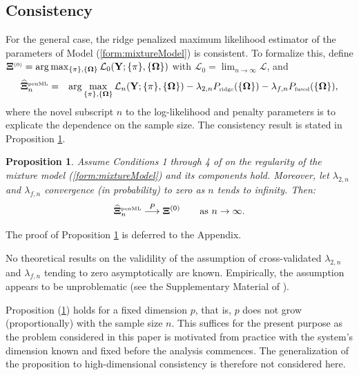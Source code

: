 \documentclass[10pt]{article}
\newtheorem{proposition}{Proposition}
\newcounter{proof}\newcounter{currproofctr}\newcounter{endproofctr}%
\begin{document}
\subsection{Consistency} 
For the general case, the ridge penalized maximum likelihood estimator of the parameters of Model (\ref{form:mixtureModel}) is consistent. To formalize this, define
$\mathbf{\Xi}^{\mbox{{\tiny (0)}}}  = \arg \max_{\{\pi \}, \{\mathbf{\Omega} \}} \mathcal{L}_0(\mathbf{Y}; \{\pi \}, \{\mathbf{\Omega} \} )$ with $\mathcal{L}_0 = \lim_{n\rightarrow \infty} \mathcal{L}$, and
\begin{eqnarray*}
\widehat{\mathbf{\Xi}}_n^{\mbox{{\tiny penML}}} & = & \arg \max_{\{\pi \}, \{\mathbf{\Omega} \}} \mathcal{L}_n(\mathbf{Y}; \{\pi \}, \{\mathbf{\Omega} \} ) - \lambda_{2,n} P_{\mbox{{\tiny ridge}}}( \{\mathbf{\Omega} \}) - \lambda_{f,n} P_{\mbox{{\tiny fused}}}( \{\mathbf{\Omega} \}),
\end{eqnarray*}
where the novel subscript $n$ to the log-likelihood and penalty parameters is to explicate the dependence on the sample size. %
The consistency result is stated in Proposition \ref{prop.consistency}.
\begin{proposition} \label{prop.consistency}
Assume Conditions 1 through 4 of \cite{Redn1984} on the regularity of the mixture model (\ref{form:mixtureModel}) and its components hold. Moreover, let $\lambda_{2,n}$ and $\lambda_{f,n}$ convergence (in probability) to zero as $n$ tends to infinity. Then:
\begin{eqnarray*}
\widehat{\mathbf{\Xi}}^{\mbox{{\tiny penML}}}_n \stackrel{P}{\longrightarrow} \mathbf{\Xi}^{(0)} \qquad \mbox{as } n \rightarrow \infty.
\end{eqnarray*}
\end{proposition}
The proof of Proposition \ref{prop.consistency} is deferred to the Appendix.

No theoretical results on the validility of the assumption of cross-validated $\lambda_{2,n}$ and $\lambda_{f,n}$ tending to zero asymptotically are known. Empirically, the assumption appears to be unproblematic (see the Supplementary Material of \cite{VWie2016a}).

Proposition (\ref{prop.consistency}) holds for a fixed dimension $p$, that is, $p$ does not grow (proportionally) with the sample size $n$. This suffices for the present purpose as the problem considered in this paper is motivated from practice with the system's dimension known and fixed before the analysis commences. The generalization of the proposition to high-dimensional consistency is therefore not considered here.
\end{document}
